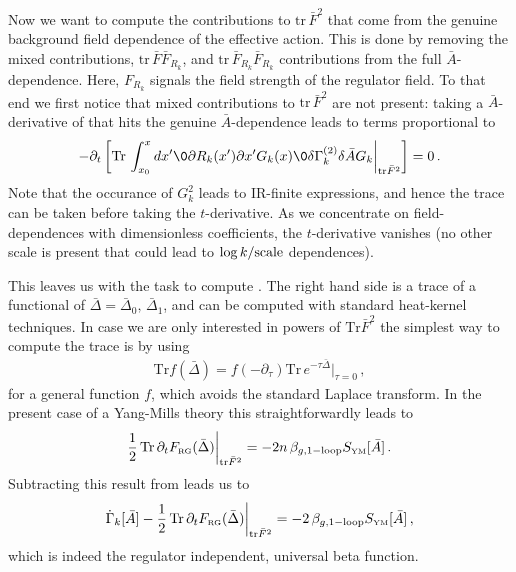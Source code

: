 \documentclass[11pt]{book} %
\newcommand{\tr}{\mathrm{tr}}
\newcommand{\Tr}{\mathrm{Tr}}
\begin{document}
{Now we want to compute the contributions to $\tr\, \bar F^2$ that
come from the genuine background field dependence of the effective
action. This is done by removing the mixed contributions, $\tr\, \bar
F \bar F_{R_k}$, and $\tr \,\bar F_{R_k} \bar F_{R_k}$ contributions
from the full $\bar A$-dependence. Here, $F_{R_k}$ signals the field
strength of the regulator field. To that end we first notice that
mixed contributions to $\tr\, \bar F^2$ are not present: taking a
$\bar A$-derivative of  that hits the genuine $\bar
A$-dependence leads to terms proportional to
\begin{align}
	\label{eq:mixed}
	- \partial_t
	\left[\Tr\,
		\int_{x_0}^x d x' \0{\partial
		R_k(x')}{\partial x'} G_k(x) \0{\delta
		\Gamma_k^{(2)}}{\delta\bar A} G_k
		\bigg|_{\tr \bar F^2}
	\right]=0\,.
\end{align}
Note that the occurance of $G_k^2$ leads to IR-finite expressions, and
hence the trace can be taken before taking the $t$-derivative. As we
concentrate on field-dependences with dimensionless coefficients, the
$t$-derivative vanishes (no other scale is present that could lead to
$\log k/{\rm scale}$ dependences).

This leaves us with the task to compute . The
right hand side is a trace of a functional of $\bar \Delta =
\bar\Delta_0, \,\bar\Delta_1$, and can be computed with standard
heat-kernel techniques. In case we are only interested in powers of $\Tr
\bar F^2$ the simplest way to compute the trace is by using
\begin{align}
	\label{eq:tau_expansion}
	\Tr f(\bar \Delta) =
	f(-\partial_\tau ) \Tr\, e^{-\tau \bar
	\Delta}\bigg|_{\tau=0} \,,
\end{align}
for a general function $f$, which avoids the standard Laplace
transform. In the present case of a Yang-Mills theory this straightforwardly
leads to
\begin{align}
	\label{eq:betabarARk}
  \frac{1}{2} \, \Tr\, \partial_t F_{\text{\tiny RG}}(\bar \Delta) \bigg|_{\tr \bar F^2}= -2 n
	\,\beta_{g,\rm 1-loop} S_{\text{\tiny YM}}[\bar A]\,.
\end{align}
Subtracting this result from  leads us to
\begin{align} \label{eq:betabarAfinal}  \dot \Gamma_k[ \bar A]-
  \frac{1}{2} \, \Tr\, \partial_t F_{\text{\tiny RG}}(\bar \Delta)\bigg|_{\tr \bar
	F^2} = -2 \,\beta_{g,\rm 1-loop} S_{\text{\tiny YM}}[\bar A]\,,
\end{align}
which is indeed the regulator independent, universal beta function.

}
\end{document}

